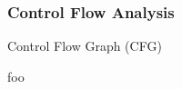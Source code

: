 
\subsubsection{Control Flow Analysis}
\label{sec:control_flow_analysis}

Control Flow Graph (CFG)

foo


\begin{figure}[htbp]
	\centering
	\begin{subfigure}[ht]{0.23\textwidth}
		\centering
		\begin{subfigure}[ht]{0.45\textwidth}
			
		\end{subfigure}
		\begin{subfigure}[ht]{0.42\textwidth}

\end{subfigure}
\end{subfigure}
\end{figure}
